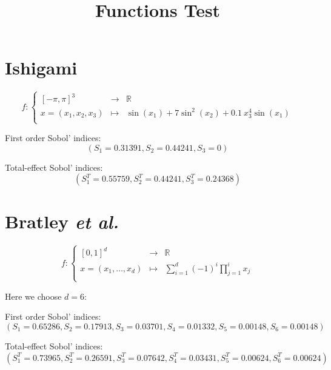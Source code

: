 \documentclass[10pt,a4paper]{article}
\begin{document}
\title{Functions Test}
\date{}
\maketitle

\section*{Ishigami}

\bigskip

\begin{equation*}
f \colon \left\lbrace \begin{array}{ccccc}
 [-\pi,\pi]^3 & \to & \mathbb{R} \\
  x=(x_1,x_2,x_3) & \mapsto &  \sin(x_1)+7  \sin^2(x_2)+0.1 \ x_3^4 \sin(x_1)\\
\end{array} \right.
\end{equation*}

\bigskip

First order Sobol' indices: $$(S_1=0.31391, S_2=0.44241, S_3=0)$$

\bigskip

Total-effect Sobol' indices: $$(S_1^T=0.55759, S_2^T=0.44241, S_3^T=0.24368)$$

\bigskip

\section*{Bratley \it{et al.}}

\bigskip

\begin{equation*}
f \colon \left\lbrace \begin{array}{ccccc}
 [0,1]^d & \to & \mathbb{R} \\
  x=(x_1,\dots,x_d) & \mapsto &  \sum \limits_{i=1}^d (-1)^i \prod \limits_{j=1}^i x_j \\
\end{array} \right.
\end{equation*}

\bigskip

Here we choose $d=6$:

\bigskip

First order Sobol' indices: $$(S_1=0.65286, S_2=0.17913, S_3=0.03701, S_4=0.01332, S_5=0.00148, S_6=0.00148)$$

\bigskip

Total-effect Sobol' indices: $$(S_1^T=0.73965,S_2^T=0.26591, S_3^T=0.07642, S_4^T=0.03431, S_5^T=0.00624, S_6^T=0.00624)$$
\end{document}
